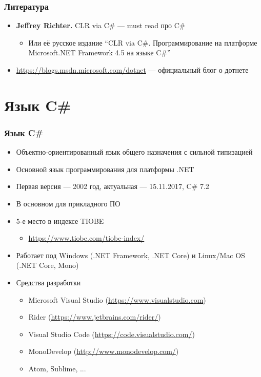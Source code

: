 \documentclass[xetex,mathserif,serif]{beamer}
\begin{document}
	\begin{frame}
	\frametitle{Литература}
		\begin{itemize}
			\item \textbf{Jeffrey Richter.} CLR via C\# --- must read про C\#
			\begin{itemize}
				\item Или её русское издание ``CLR via C\#. Программирование на платформе Microsoft.NET Framework 4.5 на языке C\#''
			\end{itemize}
			\item \url{https://blogs.msdn.microsoft.com/dotnet} --- официальный блог о дотнете
		\end{itemize}
	\end{frame}

	\section{Язык C\#}

	\begin{frame}
		\frametitle{Язык C\#}
		\begin{itemize}
			\item Объектно-ориентированный язык общего назначения с сильной типизацией
			\item Основной язык программирования для платформы .NET
			\item Первая версия --- 2002 год, актуальная --- 15.11.2017, C\# 7.2
			\item В основном для прикладного ПО
			\item 5-е место в индексе TIOBE
			\begin{itemize}
				\item \url{https://www.tiobe.com/tiobe-index/}
			\end{itemize}
			\item Работает под Windows (.NET Framework, .NET Core) и Linux/Mac OS (.NET Core, Mono)
			\item Средства разработки
			\begin{itemize}
				\item Microsoft Visual Studio (\url{https://www.visualstudio.com})
				\item Rider (\url{https://www.jetbrains.com/rider/})
				\item Visual Studio Code (\url{https://code.visualstudio.com/})
				\item MonoDevelop (\url{http://www.monodevelop.com/})
				\item Atom, Sublime, ...
			\end{itemize}
		\end{itemize}
	\end{frame}
\end{document}
